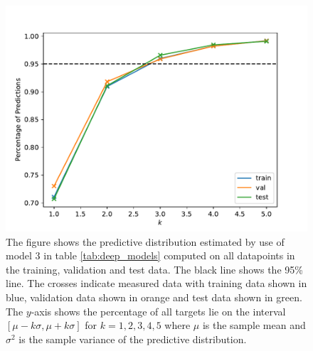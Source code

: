 \begin{figure}[h!]
    \centering
    \includegraphics[scale=0.7]{figures/confidence_estimation/good_vs_bad_cases_confidence.pdf}
    \caption{
        The figure shows the predictive distribution estimated by use of model 3 in table \ref{tab:deep_models}
        computed on all datapoints in the training, validation and test data. The black line shows the 95\% line. The crosses indicate measured data with training data shown in blue, validation data shown in orange and test data shown in green. The $y$-axis shows the percentage of all targets lie on the interval $[\mu - k\sigma, \mu + k\sigma]$ for $k=1,2,3,4,5$ where $\mu$ is the sample mean and $\sigma^2$ is the sample variance of the predictive distribution.
    }
    \label{fig:confidence}
\end{figure}






